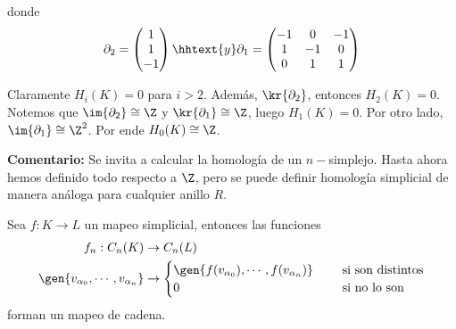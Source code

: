 \documentclass{article}
\begin{document}
\begin{enumerate}
    \vspace{2mm}
    \centerline{
    }
    \vspace{2mm}
    donde
    \begin{equation*}
        \partial_{2}=\begin{pmatrix}
            1 \\ 1 \\ -1
        \end{pmatrix}
        \hhtext{y}
        \partial_{1}=\begin{pmatrix}
            -1 & 0 & -1 \\ 1 & -1 & 0 \\ 0 & 1 & 1
        \end{pmatrix}
    \end{equation*}

    Claramente $H_{i}(K)=0$ para $i>2$. Además, $\kr{\partial_{2}}$, entonces $H_{2}(K)=0$. 
    Notemos que $\im{\partial_{2}}\cong\Z$ y $\kr{\partial_{1}}\cong\Z$, luego $H_{1}(K)=0$. Por
    otro lado, $\im{\partial_{1}}\cong\Z^{2}$. Por ende $H_{0}(K)\cong\Z$.
\end{enumerate}

\vspace{2mm}
\noindent\textbf{Comentario:} Se invita a calcular la homología de un $n-$simplejo. Hasta ahora 
hemos definido todo respecto a $\Z$, pero se puede definir homología simplicial de manera análoga 
para cualquier anillo $R$.

\begin{lema}
    Sea $f:K\to L$ un mapeo simplicial, entonces las funciones
    \begin{align*}
        f_{n}:C_{n}(K) &\to C_{n}(L) \\
        \gen{v_{\alpha_{0}},\cdots,v_{\alpha_{n}}} &\to \begin{cases}
            \gen{f(v_{\alpha_{0}}),\cdots,f(v_{\alpha_{n}})} &\quad\text{ si son distintos} \\
            0 &\quad\text{ si no lo son}
        \end{cases}
    \end{align*}
    forman un mapeo de cadena.
\end{lema}

\end{document}
